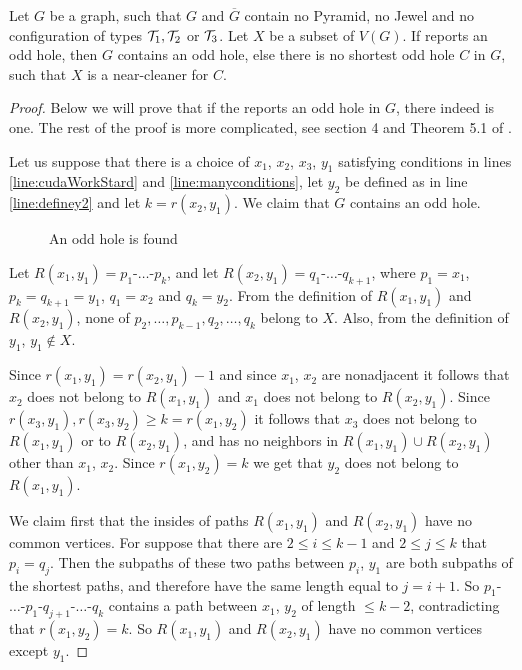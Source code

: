 \begin{theorem}
	\label{thm:testNCWorks}
	Let $G$ be a graph, such that $G$ and $\overline{G}$ contain no Pyramid, no Jewel and no configuration of types $\mathcal{T}_1, \mathcal{T}_2$ or $\mathcal{T}_3$. Let $X$ be a subset of $V(G)$. If  reports an odd hole, then $G$ contains an odd hole, else there is no shortest odd hole $C$ in $G$, such that $X$ is a near-cleaner for $C$.
\end{theorem}
\begin{proof}
	Below we will prove that if the  reports an odd hole in $G$, there indeed is one. The rest of the proof is more complicated, see section 4 and Theorem 5.1 of \cite{MC05}.

	Let us suppose that there is a choice of $x_1$, $x_2$, $x_3$, $y_1$ satisfying conditions in lines \ref{line:cudaWorkStard} and \ref{line:manyconditions}, let $y_2$ be defined as in line \ref{line:definey2} and let $k = r(x_2, y_1)$. We claim that $G$ contains an odd hole.
	
	{\makeatletter
	\let\par\@@par
	\par{}
	\everypar{}\begin{wrapfigure}{r}{0.35\textwidth}
		
		\caption{An odd hole is found}%
		\vspace{-0.3cm}
		\end{wrapfigure}
		Let $R(x_1, y_1) = p_1$-$\ldots$-$p_k$, and let $R(x_2, y_1) = q_1$-$\ldots$-$q_{k+1}$, where $p_1 = x_1$, $p_k = q_{k+1} = y_1$, $q_1 = x_2$ and $q_k = y_2$. From the definition of $R(x_1, y_1)$ and $R(x_2, y_1)$, none of $p_2, \ldots, p_{k-1}, q_2, \ldots, q_k$ belong to $X$. Also, from the definition of $y_1$, $y_1 \notin X$.

		Since $r(x_1, y_1) = r(x_2, y_1) - 1$ and since $x_1$, $x_2$ are nonadjacent it follows that $x_2$ does not belong to $R(x_1, y_1)$ and $x_1$ does not belong to $R(x_2, y_1)$. Since $r(x_3, y_1), r(x_3, y_2) \geq k = r(x_1, y_2)$ it follows that $x_3$ does not belong to $R(x_1, y_1)$ or to $R(x_2, y_1)$, and has no neighbors in $R(x_1, y_1) \cup R(x_2, y_1)$ other than $x_1$, $x_2$. Since $r(x_1, y_2) = k$ we get that $y_2$ does not belong to $R(x_1, y_1)$.
		
		We claim first that the insides of paths $R(x_1, y_1)$ and $R(x_2, y_1)$ have no common vertices. For suppose that there are $2 \leq i \leq k-1$ and $2 \leq j \leq k$ that $p_i = q_j$. Then the subpaths of these two paths between $p_i$, $y_1$ are both subpaths of the shortest paths, and therefore have the same length equal to $j=i+1$. So $p_1$-$\ldots$-$p_1$-$q_{j+1}$-$\ldots$-$q_k$ contains a path between $x_1$, $y_2$ of length $\leq k-2$, contradicting that $r(x_1, y_2) = k$. So $R(x_1, y_1)$ and $R(x_2, y_1)$ have no common vertices except $y_1$.\par}%


\end{proof}
